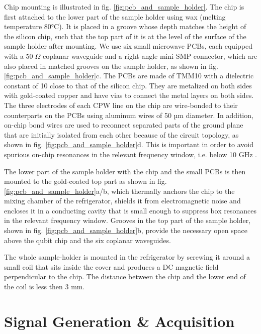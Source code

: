 Chip mounting is illustrated in  fig. \ref{fig:pcb_and_sample_holder}. The chip is first attached to the lower part of the sample holder using wax (melting temperature 80°C). It is placed in a groove whose depth matches the height of the silicon chip, such that the top part of it is at the level of the surface of the sample holder after mounting. We use six small microwave PCBs, each equipped with a $50\;\Omega$ coplanar waveguide and a right-angle mini-SMP connector, which are also placed in matched grooves on the sample holder, as shown in fig. \ref{fig:pcb_and_sample_holder}c. The PCBs are made of TMM10 with a dielectric constant of 10 close to that of the silicon chip. They are metalized on both sides with gold-coated copper and have vias to connect the metal layers on both sides. The three electrodes of each CPW line on the chip are wire-bonded to their counterparts on the PCBs using aluminum wires of 50 µm diameter. In addition, on-chip bond wires are used to reconnect separated parts of the ground plane that are initially isolated from each other because of the circuit topology, as shown in fig. \ref{fig:pcb_and_sample_holder}d. This is important in order to avoid spurious on-chip resonances in the relevant frequency window, i.e. below 10 GHz \citep{schuster_circuit_2007}.

The lower part of the sample holder with the chip and the small PCBs is then mounted to the gold-coated top part as shown in fig. \ref{fig:pcb_and_sample_holder}a/b, which thermally anchors the chip to the mixing chamber of the refrigerator, shields it from electromagnetic noise and encloses it in a conducting cavity that is small enough to suppress box resonances in the relevant frequency window. Grooves in the top part of the sample holder, shown in fig. \ref{fig:pcb_and_sample_holder}b, provide the necessary open space above the qubit chip and the six coplanar waveguides.

The whole sample-holder is mounted in the refrigerator by screwing it around a small coil that sits inside the cover and produces a DC magnetic field perpendicular to the chip. The distance between the chip and the lower end of the coil is less then 3 mm.

\section{Signal Generation \& Acquisition}

